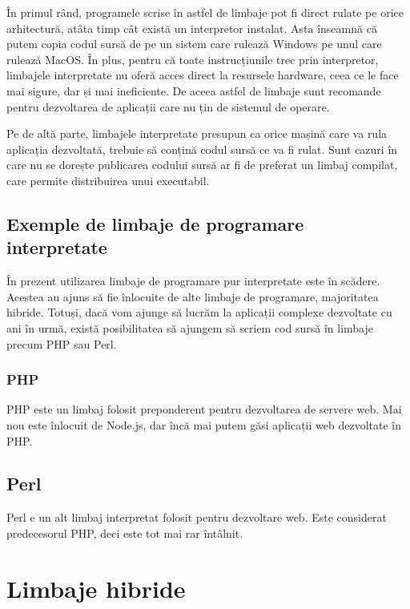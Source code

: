 În primul rând, programele scrise în astfel de limbaje pot fi direct rulate pe
orice arhitectură, atâta timp cât există un interpretor instalat. Asta înseamnă
că putem copia codul sursă de pe un sistem care rulează Windows pe unul care
rulează MacOS. În plus, pentru că toate instrucțiunile trec prin interpretor,
limbajele interpretate nu oferă acces direct la resursele hardware, ceea ce le
face mai sigure, dar și mai ineficiente. De aceea astfel de limbaje sunt
recomande pentru dezvoltarea de aplicații care nu țin de sistemul de operare.

Pe de altă parte, limbajele interpretate presupun ca orice mașină care va rula
aplicația dezvoltată, trebuie să conțină codul sursă ce va fi rulat. Sunt cazuri
în care nu se dorește publicarea codului sursă ar fi de preferat un limbaj
compilat, care permite distribuirea unui executabil.

\subsection{Exemple de limbaje de programare interpretate}
\label{sec:appdev-langs-int-ex}

În prezent utilizarea limbaje de programare pur interpretate este în scădere.
Acestea au ajuns să fie înlocuite de alte limbaje de programare, majoritatea
hibride. Totuși, dacă vom ajunge să lucrăm la aplicații complexe dezvoltate cu
ani în urmă, există posibilitatea să ajungem să scriem cod sursă în limbaje
precum PHP sau Perl.

\subsubsection{PHP}
\label{sec:appdev-langs-int-ex-php}

PHP este un limbaj folosit preponderent pentru dezvoltarea de servere web. Mai
nou este înlocuit de Node.js, dar încă mai putem găsi aplicații web dezvoltate
în PHP.

\subsection{Perl}
\label{sec:appdev-langs-int-ex-perl}

Perl e un alt limbaj interpretat folosit pentru dezvoltare web. Este considerat
predecesorul PHP, deci este tot mai rar întâlnit.

\section{Limbaje hibride}
\label{sec:appdev-langs-hybrid}

